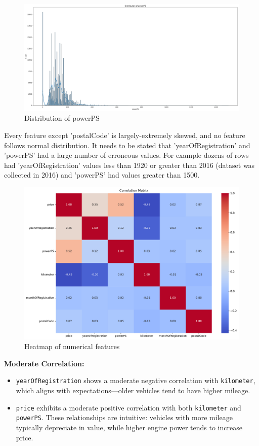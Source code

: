 \documentclass[conference]{IEEEtran}
\begin{document}
\begin{figure}[H]
\centering
\includegraphics[width=\linewidth]{figures/powerPS_distribution.pdf}
\caption{Distribution of powerPS}
\label{fig:powerPS_dist}
\end{figure}

Every feature except 'postalCode' is largely-extremely skewed, and no feature
follows normal distribution. It needs to be stated that 'yearOfRegistration'
and 'powerPS' had a large number of erroneous values. For example dozens of
rows had 'yearOfRegistration' values less than 1920 or greater than 2016
(dataset was collected in 2016) and 'powerPS' had values greater than 1500.

\begin{figure}[H]
\centering
\includegraphics[width=\linewidth]{figures/heatmap.pdf}
\caption{Heatmap of numerical features}
\label{fig:heatmap}
\end{figure}

\textbf{Moderate Correlation:}
\begin{itemize}
    \item \texttt{yearOfRegistration} shows a moderate negative correlation
            with \texttt{kilometer}, which aligns with expectations—older
            vehicles tend to have higher mileage.
    \item \texttt{price} exhibits a moderate positive correlation with both
            \texttt{kilometer} and \texttt{powerPS}. These relationships are
            intuitive: vehicles with more mileage typically depreciate in
            value, while higher engine power tends to increase price.
\end{itemize}
\end{document}
